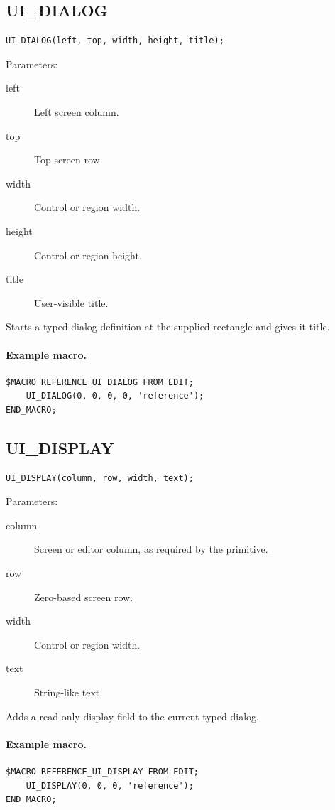 \documentclass[a4paper,10pt,twoside,openany]{book}
\newenvironment{mrmacextension}{\begin{changebar}}{\end{changebar}}
\begin{document}
\begin{mrmacextension}
\label{prim:procedure-ui-dialog}
\subsection*{UI\_DIALOG}
\begin{verbatim}
UI_DIALOG(left, top, width, height, title);
\end{verbatim}
Parameters:
\begin{description}
\item[left] Left screen column.
\item[top] Top screen row.
\item[width] Control or region width.
\item[height] Control or region height.
\item[title] User-visible title.
\end{description}

Starts a typed dialog definition at the supplied rectangle and gives it title.

\paragraph{Example macro.}
\begin{verbatim}
$MACRO REFERENCE_UI_DIALOG FROM EDIT;
    UI_DIALOG(0, 0, 0, 0, 'reference');
END_MACRO;
\end{verbatim}
\end{mrmacextension}

\begin{mrmacextension}
\label{prim:procedure-ui-display}
\subsection*{UI\_DISPLAY}
\begin{verbatim}
UI_DISPLAY(column, row, width, text);
\end{verbatim}
Parameters:
\begin{description}
\item[column] Screen or editor column, as required by the primitive.
\item[row] Zero-based screen row.
\item[width] Control or region width.
\item[text] String-like text.
\end{description}

Adds a read-only display field to the current typed dialog.

\paragraph{Example macro.}
\begin{verbatim}
$MACRO REFERENCE_UI_DISPLAY FROM EDIT;
    UI_DISPLAY(0, 0, 0, 'reference');
END_MACRO;
\end{verbatim}
\end{mrmacextension}
\end{document}
